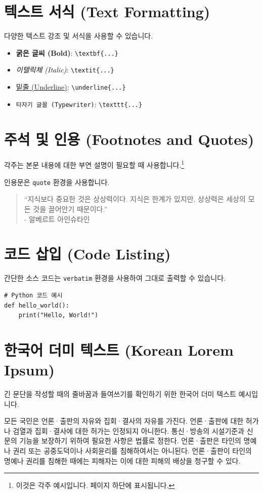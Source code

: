 \documentclass[master, korean]{pnuthesis}
\begin{document}
\section{텍스트 서식 (Text Formatting)}
다양한 텍스트 강조 및 서식을 사용할 수 있습니다.
\begin{itemize}
    \item \textbf{굵은 글씨 (Bold)}: \texttt{\textbackslash textbf\{...\}}
    \item \textit{이탤릭체 (Italic)}: \texttt{\textbackslash textit\{...\}}
    \item \underline{밑줄 (Underline)}: \texttt{\textbackslash underline\{...\}}
    \item \texttt{타자기 글꼴 (Typewriter)}: \texttt{\textbackslash texttt\{...\}}
\end{itemize}

\section{주석 및 인용 (Footnotes and Quotes)}
각주는 본문 내용에 대한 부연 설명이 필요할 때 사용합니다.\footnote{이것은 각주 예시입니다. 페이지 하단에 표시됩니다.}

인용문은 \texttt{quote} 환경을 사용합니다.
\begin{quote}
    ``지식보다 중요한 것은 상상력이다. 지식은 한계가 있지만, 상상력은 세상의 모든 것을 끌어안기 때문이다.'' \\
    - 알베르트 아인슈타인
\end{quote}

\section{코드 삽입 (Code Listing)}
간단한 소스 코드는 \texttt{verbatim} 환경을 사용하여 그대로 출력할 수 있습니다.

\begin{verbatim}
# Python 코드 예시
def hello_world():
    print("Hello, World!")
\end{verbatim}

\section{한국어 더미 텍스트 (Korean Lorem Ipsum)}
긴 문단을 작성할 때의 줄바꿈과 들여쓰기를 확인하기 위한 한국어 더미 텍스트 예시입니다.

모든 국민은 언론·출판의 자유와 집회·결사의 자유를 가진다. 언론·출판에 대한 허가나 검열과 집회·결사에 대한 허가는 인정되지 아니한다. 통신·방송의 시설기준과 신문의 기능을 보장하기 위하여 필요한 사항은 법률로 정한다. 언론·출판은 타인의 명예나 권리 또는 공중도덕이나 사회윤리를 침해하여서는 아니된다. 언론·출판이 타인의 명예나 권리를 침해한 때에는 피해자는 이에 대한 피해의 배상을 청구할 수 있다.
\end{document}
